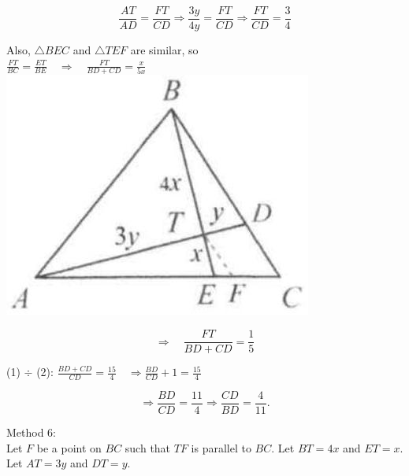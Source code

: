 \documentclass{article}
\begin{document}
\[
\frac{A T}{A D}=\frac{F T}{C D} \Rightarrow \frac{3 y}{4 y}=\frac{F T}{C D} \Rightarrow \frac{F T}{C D}=\frac{3}{4}
\]

Also, \(\triangle B E C\) and \(\triangle T E F\) are similar, so\\
\(\frac{F T}{B C}=\frac{E T}{B E} \quad \Rightarrow \quad \frac{F T}{B D+C D}=\frac{x}{5 x}\)\\
\centering
\includegraphics[width=\textwidth]{images/105(1).jpg}

\[
\Rightarrow \quad \frac{F T}{B D+C D}=\frac{1}{5}
\]

(1) \(\div\) (2): \(\frac{B D+C D}{C D}=\frac{15}{4} \quad \Rightarrow \frac{B D}{C D}+1=\frac{15}{4}\)

\[
\Rightarrow \frac{B D}{C D}=\frac{11}{4} \Rightarrow \frac{C D}{B D}=\frac{4}{11} .
\]

Method 6:\\
Let \(F\) be a point on \(B C\) such that \(T F\) is parallel to \(B C\). Let \(B T=4 x\) and \(E T=x\). Let \(A T=3 y\) and \(D T=y\).
\end{document}
